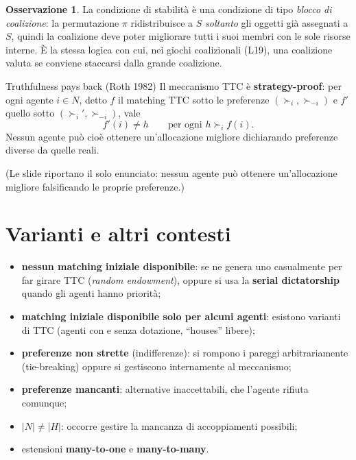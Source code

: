 \documentclass[12pt,a4paper,twoside]{book}
\theoremstyle{plain}
\theoremstyle{definition}
\newtheorem{remark}[theorem]{Osservazione}
\begin{document}
\begin{remark}
La condizione di stabilità è una condizione di tipo \emph{blocco di coalizione}: la permutazione $\pi$ ridistribuisce a $S$ \emph{soltanto} gli oggetti già assegnati a $S$, quindi la coalizione deve poter migliorare tutti i suoi membri con le sole risorse interne. È la stessa logica con cui, nei giochi coalizionali (L19), una coalizione valuta se conviene staccarsi dalla grande coalizione.
\end{remark}

\begin{thmbox}{Truthfulness pays back (Roth 1982)}
Il meccanismo TTC è \textbf{strategy-proof}: per ogni agente $i\in N$, detto $f$ il matching TTC sotto le preferenze $(\succ_i,\succ_{-i})$ e $f'$ quello sotto $(\succ_i',\succ_{-i})$, vale
\[ f'(i)\ne h\qquad\text{per ogni } h\succ_i f(i). \]
Nessun agente può cioè ottenere un'allocazione migliore dichiarando preferenze diverse da quelle reali.
\end{thmbox}

(Le slide riportano il solo enunciato: nessun agente può ottenere un'allocazione migliore falsificando le proprie preferenze.)

\section{Varianti e altri contesti}

\begin{itemize}
  \item \textbf{nessun matching iniziale disponibile}: se ne genera uno casualmente per far girare TTC (\emph{random endowment}), oppure si usa la \textbf{serial dictatorship} quando gli agenti hanno priorità;
  \item \textbf{matching iniziale disponibile solo per alcuni agenti}: esistono varianti di TTC (agenti con e senza dotazione, ``houses'' libere);
  \item \textbf{preferenze non strette} (indifferenze): si rompono i pareggi arbitrariamente (tie-breaking) oppure si gestiscono internamente al meccanismo;
  \item \textbf{preferenze mancanti}: alternative inaccettabili, che l'agente rifiuta comunque;
  \item $|N|\ne|H|$: occorre gestire la mancanza di accoppiamenti possibili;
  \item estensioni \textbf{many-to-one} e \textbf{many-to-many}.
\end{itemize}
\end{document}
